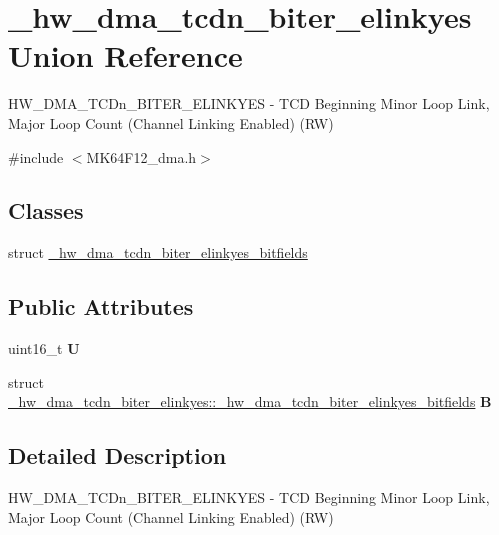\hypertarget{union__hw__dma__tcdn__biter__elinkyes}{}\section{\+\_\+hw\+\_\+dma\+\_\+tcdn\+\_\+biter\+\_\+elinkyes Union Reference}
\label{union__hw__dma__tcdn__biter__elinkyes}


H\+W\+\_\+\+D\+M\+A\+\_\+\+T\+C\+Dn\+\_\+\+B\+I\+T\+E\+R\+\_\+\+E\+L\+I\+N\+K\+Y\+ES -\/ T\+CD Beginning Minor Loop Link, Major Loop Count (Channel Linking Enabled) (RW)  




{\ttfamily \#include $<$M\+K64\+F12\+\_\+dma.\+h$>$}

\subsection*{Classes}
\begin{DoxyCompactItemize}
\item 
struct \hyperlink{struct__hw__dma__tcdn__biter__elinkyes_1_1__hw__dma__tcdn__biter__elinkyes__bitfields}{\+\_\+hw\+\_\+dma\+\_\+tcdn\+\_\+biter\+\_\+elinkyes\+\_\+bitfields}
\end{DoxyCompactItemize}
\subsection*{Public Attributes}
\begin{DoxyCompactItemize}
\item 
uint16\+\_\+t {\bfseries U}\hypertarget{union__hw__dma__tcdn__biter__elinkyes_a31c1b5236cb32e0aa34c948ca927c3f5}{}\label{union__hw__dma__tcdn__biter__elinkyes_a31c1b5236cb32e0aa34c948ca927c3f5}

\item 
struct \hyperlink{struct__hw__dma__tcdn__biter__elinkyes_1_1__hw__dma__tcdn__biter__elinkyes__bitfields}{\+\_\+hw\+\_\+dma\+\_\+tcdn\+\_\+biter\+\_\+elinkyes\+::\+\_\+hw\+\_\+dma\+\_\+tcdn\+\_\+biter\+\_\+elinkyes\+\_\+bitfields} {\bfseries B}\hypertarget{union__hw__dma__tcdn__biter__elinkyes_ad69b04faebe264bcc1a6a6b049263121}{}\label{union__hw__dma__tcdn__biter__elinkyes_ad69b04faebe264bcc1a6a6b049263121}

\end{DoxyCompactItemize}


\subsection{Detailed Description}
H\+W\+\_\+\+D\+M\+A\+\_\+\+T\+C\+Dn\+\_\+\+B\+I\+T\+E\+R\+\_\+\+E\+L\+I\+N\+K\+Y\+ES -\/ T\+CD Beginning Minor Loop Link, Major Loop Count (Channel Linking Enabled) (RW) 

